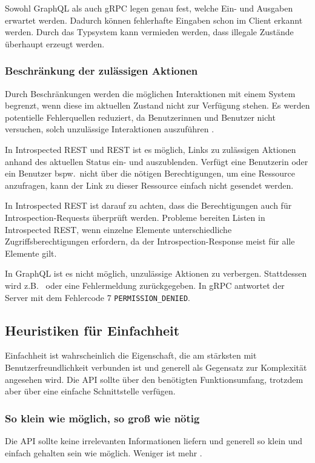 Sowohl GraphQL als auch gRPC legen genau fest, welche Ein- und Ausgaben erwartet werden. Dadurch können fehlerhafte Eingaben schon im Client erkannt werden. Durch das Typsystem kann vermieden werden, dass illegale Zustände überhaupt erzeugt werden.


\subsubsection{Beschränkung der zulässigen Aktionen}
Durch Beschränkungen werden die möglichen Interaktionen mit einem System begrenzt, wenn diese im aktuellen Zustand nicht zur Verfügung stehen. Es werden potentielle Fehlerquellen reduziert, da Benutzerinnen und Benutzer nicht versuchen, solch unzulässige Interaktionen auszuführen \autocite[S.~60]{Lidwell2010}.

\para{}In Introspected REST und REST ist es möglich, Links zu zulässigen Aktionen anhand des aktuellen Status ein- und auszublenden. Verfügt eine Benutzerin oder ein Benutzer bspw.\ nicht über die nötigen Berechtigungen, um eine Ressource anzufragen, kann der Link zu dieser Ressource einfach nicht gesendet werden.

In Introspected REST ist darauf zu achten, dass die Berechtigungen auch für Introspection-Requests überprüft werden. Probleme bereiten Listen in Introspected REST, wenn einzelne Elemente unterschiedliche Zugriffsberechtigungen erfordern, da der Introspection-Response meist für alle Elemente gilt.

In GraphQL ist es nicht möglich, unzulässige Aktionen zu verbergen. Stattdessen wird z.B.\  oder eine Fehlermeldung zurückgegeben. In gRPC antwortet der Server mit dem Fehlercode 7 \texttt{PERMISSION\_DENIED}.


\subsection{Heuristiken für Einfachheit}
Einfachheit ist wahrscheinlich die Eigenschaft, die am stärksten mit Benutzerfreundlichkeit verbunden ist und generell als Gegensatz zur Komplexität angesehen wird. Die API sollte über den benötigten Funktionsumfang, trotzdem aber über eine einfache Schnittstelle verfügen.

\subsubsection{So klein wie möglich, so groß wie nötig}
Die API sollte keine irrelevanten Informationen liefern und generell so klein und einfach gehalten sein wie möglich. Weniger ist mehr \autocites{Myers2016}[S.~115ff.]{Nielsen1994}.

